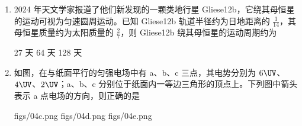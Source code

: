 \documentclass[\gkver]{gaokaozhenti}
\begin{document}
\begin{enumerate}
{则法线与竖直方向的夹角 $\alpha = \theta + i = 60^\circ$

根据光的折射定律可知 $n = \frac{\sin r}{\sin i}$

解得光线射出圆柱体时的折射角 $r = 45^\circ$

光线从圆柱体内射出时，与竖直方向的夹角为 $\beta = \alpha - r = 15^\circ$

故选 B。
}

\item
2024 年天文学家报道了他们新发现的一颗类地行星 Gliese12b，它绕其母恒星的运动可视为匀速圆周运动。已知 Gliese12b 轨道半径约为日地距离的 $\frac{1}{14}$，其母恒星质量约为太阳质量的 $\frac{2}{7}$，则 Gliese12b 绕其母恒星的运动周期约为

{27 天}
{64 天}
{128 天}


\item
如图，在与纸面平行的匀强电场中有 a、b、c 三点，其电势分别为 $6 \UV$、$4 \UV$、$2 \UV$；a、b、c 分别位于纸面内一等边三角形的顶点上。下列图中箭头表示 a 点电场的方向，则正确的是

\onepicture[w=2.60cm]{}

{figs/04c.png}
{figs/04d.png}
{figs/04e.png}

\end{enumerate}
\end{document}
